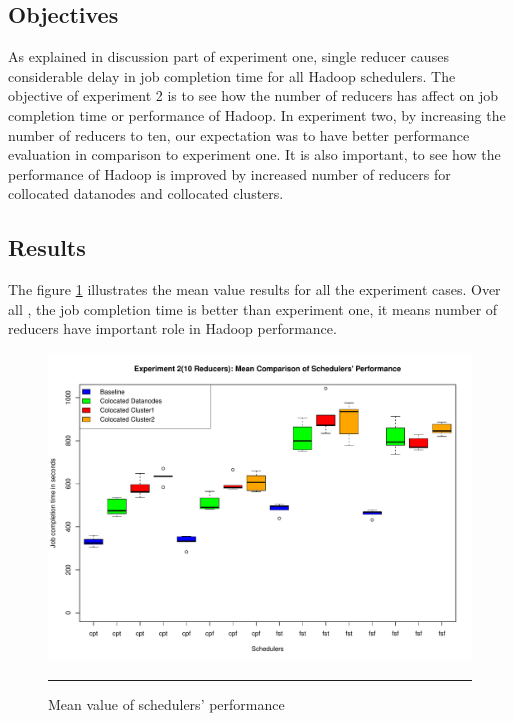 \subsection{Objectives}

As explained in discussion part of experiment one, single reducer causes considerable delay in job completion time for all Hadoop schedulers. The objective of experiment 2 is to see how the number of reducers has affect on job completion time or performance of Hadoop. In experiment two, by increasing the number of reducers to ten, our expectation was to have better performance evaluation in comparison to experiment one. It is also important, to see how the performance of Hadoop is improved by increased number of reducers for collocated datanodes and collocated clusters. 



\subsection{Results}
The figure \ref{fig:exp_2_mean} illustrates the mean value results for all the experiment cases. Over all , the job completion time is better than experiment one, it means number of reducers have important role in Hadoop performance.\\

\begin{figure}[htbp]
  \centering
    \includegraphics[width=\textwidth,height=\textheight,keepaspectratio]{./Figures/exp_2_mean.pdf}
    \rule{35em}{0.5pt}
  \caption{Mean value of schedulers' performance }
  \label{fig:exp_2_mean}
\end{figure} 

